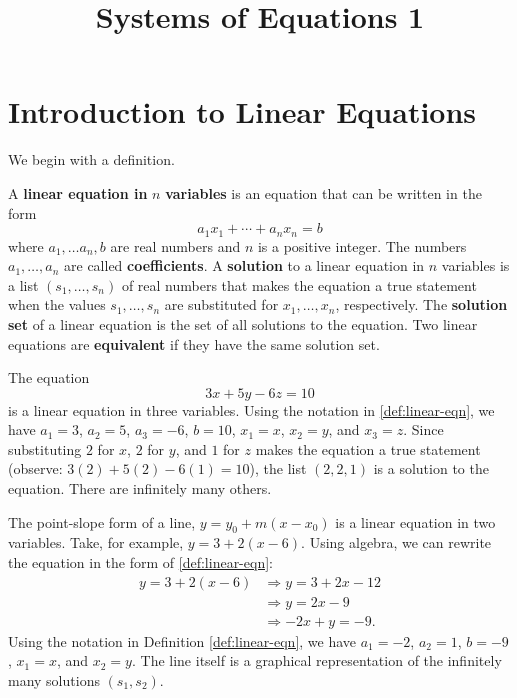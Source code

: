 \documentclass{article}
\title{Systems of Equations 1}
\author{}
\date{}
\begin{document}
\maketitle


\section{Introduction to Linear Equations}\label{sec:introduction}

We begin with a definition.

\begin{definition} \label{def:linear-eqn}
A \textbf{linear equation in} $n$ \textbf{variables} is an equation that can be written in the form
\[a_1x_1+\cdots+a_nx_n=b\]
where $a_1, \ldots a_n, b$ are real numbers and \(n\) is a positive integer. The numbers \(a_1, \ldots, a_n\) are called \textbf{coefficients}. A \textbf{solution} to a linear equation in \(n\) variables is a list \((s_1, \ldots, s_n)\) of real numbers that makes the equation a true statement when the values \(s_1, \ldots, s_n\) are substituted for \(x_1, \ldots, x_n\), respectively. The \textbf{solution set} of a linear equation is the set of all solutions to the equation. Two linear equations are \textbf{equivalent} if they have the same solution set.
\end{definition}

\begin{example}\label{ex:linear-eqn-3var}
The equation
\[3x+5y-6z=10\]
is a linear equation in three variables. Using the notation in \cref{def:linear-eqn}, we have \(a_1=3\), \(a_2=5\), \(a_3=-6\), \(b=10\), \(x_1=x\), \(x_2=y\), and \(x_3=z\). Since substituting \(2\) for \(x\), \(2\) for \(y\), and \(1\) for \(z\) makes the equation a true statement (observe: \(3(2)+5(2)-6(1)=10\)), the list \((2, 2, 1)\) is a solution to the equation. There are infinitely many others.
\end{example}

\begin{example}\label{ex:linear-eqn-pt-slope}
The point-slope form of a line, \(y=y_0+m(x-x_0)\) is a linear equation in two variables. Take, for example, \(y=3+2(x-6)\). Using algebra, we can rewrite the equation in the form of \cref{def:linear-eqn}:
\begin{align*}
    y=3+2(x-6) &\Longrightarrow y=3+2x-12 \\
    &\Longrightarrow y=2x-9 \\
    &\Longrightarrow -2x+y=-9.
\end{align*}
Using the notation in Definition \ref{def:linear-eqn}, we have \(a_1=-2\), \(a_2=1\), \(b=-9\), \(x_1=x\), and \(x_2=y\). The line itself is a graphical representation of the infinitely many solutions \((s_1, s_2)\).
\end{example}
\end{document}
